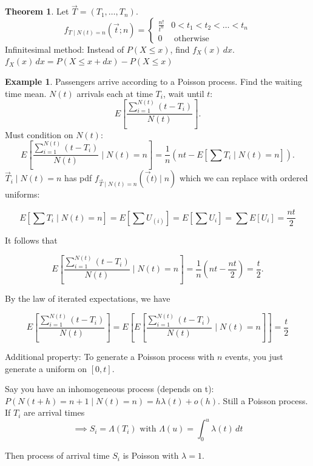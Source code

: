 \documentclass{article}
\theoremstyle{definition}
\newtheorem{exmp}{Example}[section]
\newtheorem{theorem}{Theorem}[section]
\begin{document}
\begin{theorem}
    Let $\vec{T} = \left( T_1, \ldots, T_n \right)$.
    $$
    f_{T \mid N(t) = n}\left( \vec{t}; n\right) = \begin{cases}
        \frac{n!}{t^n} & 0 < t_1 < t_2 < \ldots < t_n \\
        0 & \text{ otherwise }
    \end{cases}
    $$
    Infinitesimal method: Instead of $P(X \le x)$, find $f_X(x) \, dx$. $f_X(x) \, dx = P(X \le x + dx) - P(X \le x)$
\end{theorem}


\begin{exmp}
Passengers arrive according to a Poisson process. Find the waiting time mean. $N(t)$ arrivals each at time $T_i$, wait until $t$:
$$
E \left[ \frac{ \sum_{i=1}^{N(t)} \left(t - T_i \right) }{N(t)} \right].
$$
Must condition on $N(t)$:
$$
E \left[ \frac{ \sum_{i=1}^{N(t)} \left(t - T_i \right) }{N(t)} \mid N(t) = n \right] = \frac{1}{n} \left( n t - E \left[ \sum T_i \mid N(t) = n \right]  \right).
$$
$\vec{T}_i \mid N(t) = n$ has pdf $f_{\vec{T} \mid N(t) = n} \left( \vec(t) \mid n \right)$ which we can replace with ordered uniforms:

$$
E \left[ \sum T_i \mid N(t) = n \right] = E \left[ \sum U_{(i)} \right] = E \left[ \sum U_{i} \right] = \sum E [U_i] = \frac{nt}{2}
$$

It follows that

$$
E \left[ \frac{ \sum_{i=1}^{N(t)} \left(t - T_i \right) }{N(t)} \mid N(t) = n \right] =  \frac{1}{n} \left( n t - \frac{nt}{2} \right) = \frac{t}{2}.
$$

By the law of iterated expectations, we have

$$
E \left[ \frac{ \sum_{i=1}^{N(t)} \left(t - T_i \right) }{N(t)} \right] = E \left[ E \left[ \frac{ \sum_{i=1}^{N(t)} \left(t - T_i \right) }{N(t)} \mid N(t) = n \right] \right] = \frac{t}{2}
$$

\end{exmp}

Additional property: To generate a Poisson process with $n$ events, you just generate a uniform on $[0, t]$.

Say you have an inhomogeneous process (depends on t): $P\left( N(t+h) = n + 1 \mid N(t) = n \right) = h \lambda(t) + o(h)$.
Still a Poisson process. If $T_i$ are arrival times
$$
\implies S_i = \Lambda(T_i) \text{ with } \Lambda(u) = \int_0^u \lambda(t) \, dt
$$

Then process of arrival time $S_i$ is Poisson with $\lambda = 1$.
\end{document}
